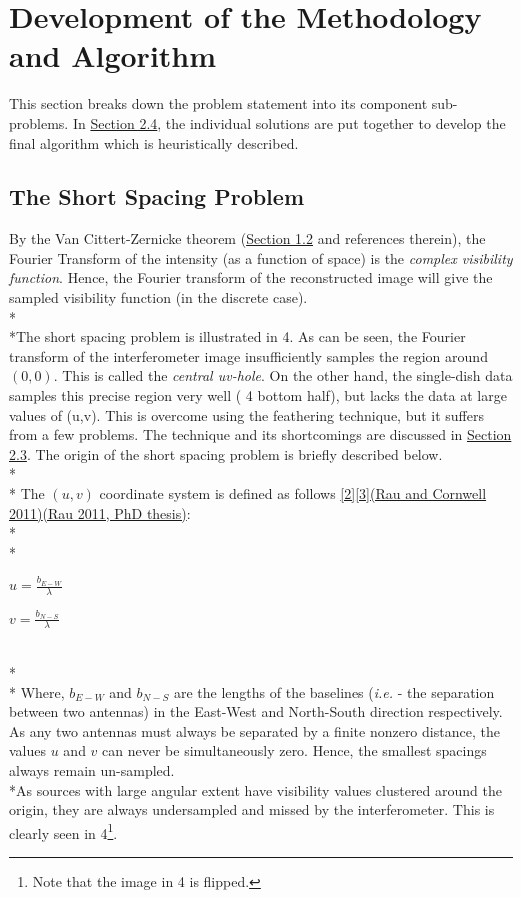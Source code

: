 \documentclass{article}
\begin{document}
\section{Development of the Methodology and Algorithm}
This section breaks down the problem statement into its component sub-problems. In \hyperref[AlgoDevpt]{Section 2.4}, the individual solutions are put together to develop the final algorithm which is heuristically described. 
\label{shortspacingprob}\subsection{The Short Spacing Problem}
By the Van Cittert-Zernicke theorem (\hyperref[sec1.2]{Section 1.2} and references therein), the Fourier Transform of the intensity (as a function of space) is the  \textit{complex visibility function}. Hence, the Fourier transform of the reconstructed image will give the sampled visibility function (in the discrete case). \\*\\*The short spacing problem is illustrated in \figurename{ 4}. As can be seen, the Fourier transform of the interferometer image insufficiently samples the region around $(0,0)$. This is called the \textit{central uv-hole}. On the other hand, the single-dish data samples this precise region very well (\figurename{ 4} bottom half), but lacks the data at large values of (u,v). This is overcome using the feathering technique, but it suffers from a few problems. The technique and its shortcomings are discussed in \hyperref[feathering]{Section 2.3}.
The origin of the short spacing problem is briefly described below. \\*\\*
The $(u,v)$ coordinate system is defined as follows \hyperref[ref2]{[2]}\hyperref[ref3]{[3]}\hyperref[urvpaper]{(Rau and Cornwell 2011)}\hyperref[urvthesis]{(Rau 2011, PhD thesis)}:
\\*\\*
\begin{minipage}{0.4\textwidth}
$u = \frac{b_{E-W}}{\lambda}$ 
\end{minipage}
\begin{minipage}{0.4\textwidth}
$v = \frac{b_{N-S}}{\lambda} $
\end{minipage}
\\*\\*
Where, $b_{E-W}$ and $b_{N-S}$ are the lengths of the baselines (\textit{i.e.} - the separation between two antennas) in the East-West and North-South direction respectively. As any two antennas must always be separated by a finite nonzero distance, the values $u$ and $v$ can never be simultaneously zero. Hence, the smallest spacings always remain un-sampled. \\*As sources with large angular extent have visibility values clustered around the origin, they are always undersampled and missed by the interferometer. This is clearly seen in \figurename{ 4}\footnote{Note that the image in \figurename{ 4} is flipped.}.
\end{document}
